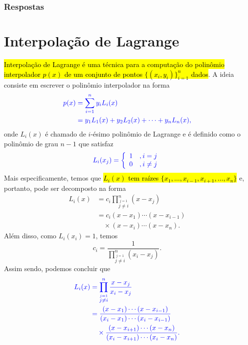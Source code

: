 \ifisbook
\subsubsection{Respostas}
\shipoutAnswer
\fi


\section{Interpolação de Lagrange}\label{cap_interp_sec_lagrange}

\hl{Interpolação de Lagrange{\lagrange} é uma técnica para a computação do polinômio interpolador $p(x)$ de um conjunto de pontos $\{(x_i, y_i)\}_{i=1}^n$ dados}. A ideia consiste em escrever o polinômio interpolador na forma
\begin{subequations}\hleq
  \begin{align}
    p(x) &= \sum_{i=1}^n y_iL_i(x)\\
         &= y_1L_1(x) + y_2L_2(x) + \cdots + y_nL_n(x),
  \end{align}
\end{subequations}
onde $L_i(x)$ é chamado de $i$-ésimo polinômio de Lagrange e é definido como o polinômio de grau $n-1$ que satisfaz
\begin{equation}\color{blue}L_i(x_j) = \left\{
    \begin{array}{ll}
      1 &, i=j\\
      0 &, i\neq j
    \end{array}
\right.
\end{equation}
Mais especificamente, temos que \hl{$L_i(x)$ tem raízes $\{x_1, \ldots, x_{i-1}, x_{i+1}, \ldots, x_n\}$} e, portanto, pode ser decomposto na forma
\begin{subequations}
  \begin{align}
    L_i(x) &= c_i\prod_{\overset{j=1}{j\neq i}}^n (x-x_j)\\
           &= c_i(x-x_1)\cdots(x-x_{i-1}) \nonumber\\
           &\quad \times (x-x_i)\cdots(x-x_n).
  \end{align}
\end{subequations}
Além disso, como $L_i(x_i) = 1$, temos
\begin{equation}
  c_i = \frac{1}{\displaystyle\prod_{\overset{j=1}{j\neq i}}^n (x_i-x_j)}.
\end{equation}
Assim sendo, podemos concluir que
\begin{subequations}\hleq
  \begin{align}
    L_i(x) &= \prod_{\overset{j=1}{j\neq i}}^n \frac{x-x_j}{x_i-x_j} \\
           &= \frac{(x-x_1)\cdots(x-x_{i-1})}{(x_i-x_1)\cdots(x_i-x_{i-1})} \nonumber \\
           &\quad \times \frac{(x-x_{i+1})\cdots(x-x_n)}{(x_i-x_{i+1})\cdots(x_i-x_n)}.
  \end{align}
\end{subequations}

